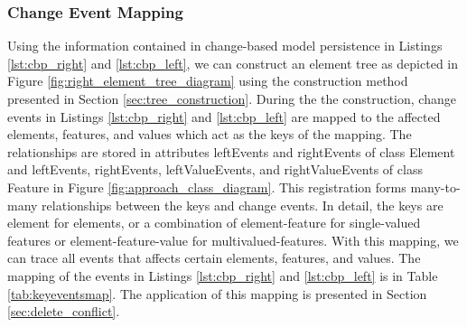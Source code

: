 \subsubsection{Change Event Mapping}
\label{sec:change_event_mapping}
Using the information contained in change-based model persistence in Listings \ref{lst:cbp_right} and \ref{lst:cbp_left}, we can construct an element tree as depicted in Figure \ref{fig:right_element_tree_diagram} using the construction method presented in Section \ref{sec:tree_construction}. During the the construction, change events in Listings \ref{lst:cbp_right} and \ref{lst:cbp_left} are mapped to the affected elements, features, and values which act as the keys of the mapping. The relationships are stored in attributes \textsf{leftEvents} and \textsf{rightEvents} of class \textsf{Element} and \textsf{leftEvents}, \textsf{rightEvents}, \textsf{leftValueEvents}, and \textsf{rightValueEvents} of class \textsf{Feature} in Figure \ref{fig:approach_class_diagram}. This registration forms many-to-many relationships between the keys and change events. In detail, the keys are \textsf{element} for elements, or a combination of \textsf{element-feature} for single-valued features or \textsf{element-feature-value} for multivalued-features. With this mapping, we can trace all events that affects certain elements, features, and values. The mapping of the events in Listings \ref{lst:cbp_right} and \ref{lst:cbp_left} is in Table \ref{tab:keyeventsmap}. The application of this mapping is presented in Section \ref{sec:delete_conflict}.

